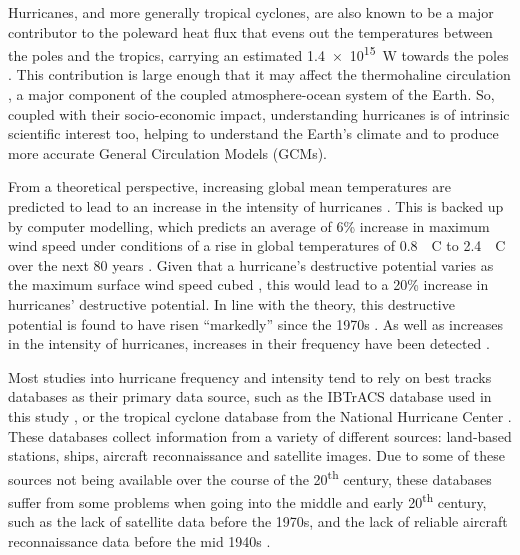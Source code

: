 \documentclass[pdftex,12pt,a4paper]{report}
\newcommand{\ts}{\textsuperscript}
\begin{document}
Hurricanes, and more generally tropical cyclones, are also known to be a major contributor to the
poleward heat flux that evens out the temperatures between the poles and the tropics, carrying an
estimated \SI{1.4e15}{W} towards the poles \parencite{emanuelContribution2001}. This
contribution is large enough that it may affect the thermohaline circulation
\parencite{hu2009effect}, a major component of the coupled atmosphere-ocean system of the Earth. So,
coupled with their socio-economic impact, understanding hurricanes is of intrinsic scientific
interest too, helping to understand the Earth's climate and to produce more accurate General
Circulation Models (GCMs).

From a theoretical perspective, increasing global mean temperatures are predicted to lead to an
increase in the intensity of hurricanes \parencite{emanuel1987dependence}. This is backed up by
computer modelling, which predicts an average of 6\% increase in maximum wind speed under conditions
of a rise in global temperatures of \SI{0.8}{\textdegree C} to \SI{2.4}{\textdegree C} over the next
80 years \parencite{knutson2004impact}. Given that a hurricane's destructive potential varies as the
maximum surface wind speed cubed \parencite{emanuel2005increasing}, this would lead to a 20\%
increase in hurricanes' destructive potential. In line with the theory, this destructive potential
is found to have risen ``markedly'' since the 1970s \parencite{emanuel2005increasing}. As well as
increases in the intensity of hurricanes, increases in their frequency have been detected
\parencite{goldenberg2001recent, holland2007heightened}.

Most studies into hurricane frequency and intensity tend to rely on best tracks databases as their
primary data source, such as the IBTrACS database used in this study
\parencite{knappInternational2010}, or the tropical cyclone database from the National Hurricane
Center \parencite[HURDAT;][]{jarvinen1984tropical}. These databases collect information from a
variety of different sources: land-based stations, ships, aircraft reconnaissance and satellite
images. Due to some of these sources not being available over the course of the 20\ts{th} century,
these databases suffer from some problems when going into the middle and early 20\ts{th} century,
such as the lack of satellite data before the 1970s, and the lack of reliable aircraft
reconnaissance data before the mid 1940s \parencite{chang2007number}. 
\end{document}
